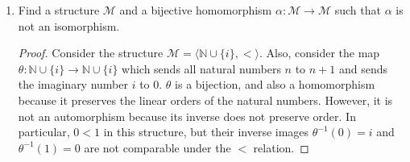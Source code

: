\documentclass{article}
\begin{document}
\begin{enumerate}
    \begin{proof}
      $\mathcal{M}=\langle\mathbb{N},<\rangle$ is one such structure. Let
      $\alpha:\mathbb{N}\rightarrow\mathbb{N}$ be an automorphism. We show by
      induction on $n\in\mathbb{N}$ that $\alpha(n)=n$. For the base case,
      if $\alpha(0)=k>0$, then since automorphisms preserve relations, and
      $k-1<k$, we have $\alpha^{-1}(k-1)<\alpha^{-1}(k)=0$, which is not
      possible because nothing in $\mathbb{N}$ is smaller than $0$. Hence
      $\alpha(0)=0$. For the inductive step, assume $\alpha(k)=k$ for
      $k\leq n\in\mathbb{N}$. If $\alpha(n+1)=n+1+k$ for some $k>0$, then
      from $n+1<n+1+k$, we get, from the preservation of relations, that
      $\alpha^{-1}(n+1)<\alpha^{-1}(n+1+k)=n+1$. Yet $\alpha^{-1}(n+1)$
      must be greater than $n+1$ from inductive hypothesis, which is a
      contradiction. Hence $\alpha(n+1)=n+1$ as required, and $\alpha$ can
      only be the identity map.
    \end{proof}

  \item Find a structure $\mathcal{M}$ and a bijective homomorphism
    $\alpha:\mathcal{M}\rightarrow\mathcal{M}$ such that $\alpha$ is not an
    isomorphism.

    \begin{proof}
      Consider the structure
      $\mathcal{M}=\langle\mathbb{N}\cup\{i\},<\rangle$. Also,
      consider the map
      $\theta:\mathbb{N}\cup\{i\}\rightarrow\mathbb{N}\cup\{i\}$ which
      sends all natural numbers $n$ to $n+1$ and sends the imaginary number
      $i$ to 0. $\theta$ is a bijection, and also a homomorphism because
      it preserves the linear orders of the natural numbers. However, it is
      not an automorphism because its inverse does not preserve order. In
      particular, $0<1$ in this structure, but their inverse images
      $\theta^{-1}(0)=i$ and $\theta^{-1}(1)=0$ are not comparable under
      the $<$ relation.
    \end{proof}
\end{enumerate}
\end{document}
